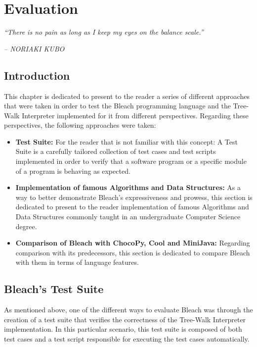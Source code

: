 \chapter{Evaluation} \label{cap:Resultados}

\begin{displayquote}
    \begin{center}
        \textit{``There is no pain as long as I keep my eyes on the balance scale.''}
    \end{center}
\end{displayquote}

\begin{flushright}
   \textit{-- NORIAKI KUBO}
\end{flushright}

\section{Introduction}
This chapter is dedicated to present to the reader a series of different approaches that were taken in order to test the Bleach programming language and the Tree-Walk Interpreter implemented for it from different perspectives. Regarding these perspectives, the following approaches were taken:
\begin{itemize}
    \item \textbf{Test Suite:} For the reader that is not familiar with this concept: A Test Suite is a carefully tailored collection of test cases and test scripts implemented in order to verify that a software program or a specific module of a program is behaving as expected.
    
    \item \textbf{Implementation of famous Algorithms and Data Structures:} As a way to better demonstrate Bleach's expressiveness and prowess, this section is dedicated to present to the reader implementation of famous Algorithms and Data Structures commonly taught in an undergraduate Computer Science degree.
    
    \item \textbf{Comparison of Bleach with ChocoPy, Cool and MiniJava:} Regarding comparison with its predecessors, this section is dedicated to compare Bleach with them in terms of language features.
\end{itemize}


\section{Bleach's Test Suite}
As mentioned above, one of the different ways to evaluate Bleach was through the creation of a test suite that verifies the correctness of the Tree-Walk Interpreter implementation. In this particular scenario, this test suite is composed of both test cases and a test script responsible for executing the test cases automatically.


